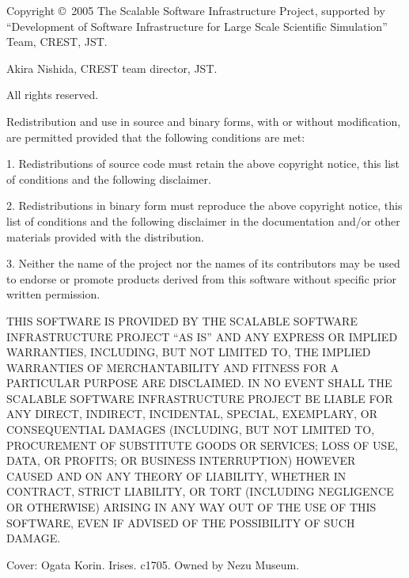 \documentclass[a4paper]{article}
\begin{document}
\newpage
\begin{flushleft}
{\small
Copyright \copyright\ 2005 The Scalable Software Infrastructure Project,
supported by ``Development of Software Infrastructure for Large Scale
Scientific Simulation'' Team, CREST, JST.

Akira Nishida, CREST team director, JST.

All rights reserved.

\vspace*{5mm}
 Redistribution and use in source and binary forms, with or without
 modification, are permitted provided that the following conditions are
 met:

 1. Redistributions of source code must retain the above copyright
 notice, this list of conditions and the following disclaimer.

 2. Redistributions in binary form must reproduce the above copyright
 notice, this list of conditions and the following disclaimer in the
 documentation and/or other materials provided with the distribution.

 3. Neither the name of the project nor the names of its contributors
 may be used to endorse or promote products derived from this software
 without specific prior written permission.

\vspace*{5mm}
 THIS SOFTWARE IS PROVIDED BY THE SCALABLE SOFTWARE INFRASTRUCTURE
 PROJECT ``AS IS'' AND ANY EXPRESS OR IMPLIED WARRANTIES, INCLUDING, BUT
 NOT LIMITED TO, THE IMPLIED WARRANTIES OF MERCHANTABILITY AND FITNESS
 FOR A PARTICULAR PURPOSE ARE DISCLAIMED. IN NO EVENT SHALL THE SCALABLE
 SOFTWARE INFRASTRUCTURE PROJECT BE LIABLE FOR ANY DIRECT, INDIRECT,
 INCIDENTAL, SPECIAL, EXEMPLARY, OR CONSEQUENTIAL DAMAGES (INCLUDING,
 BUT NOT LIMITED TO, PROCUREMENT OF SUBSTITUTE GOODS OR SERVICES; LOSS
 OF USE, DATA, OR PROFITS; OR BUSINESS INTERRUPTION) HOWEVER CAUSED AND
 ON ANY THEORY OF LIABILITY, WHETHER IN CONTRACT, STRICT LIABILITY, OR
 TORT (INCLUDING NEGLIGENCE OR OTHERWISE) ARISING IN ANY WAY OUT OF THE
 USE OF THIS SOFTWARE, EVEN IF ADVISED OF THE POSSIBILITY OF SUCH
 DAMAGE.

\vfill
Cover: Ogata Korin. Irises. c1705. Owned by Nezu Museum.
}
\end{flushleft}
\thispagestyle{empty}

\newpage
{}
\tableofcontents

\setcounter{section}{0}

\newpage
\end{document}
